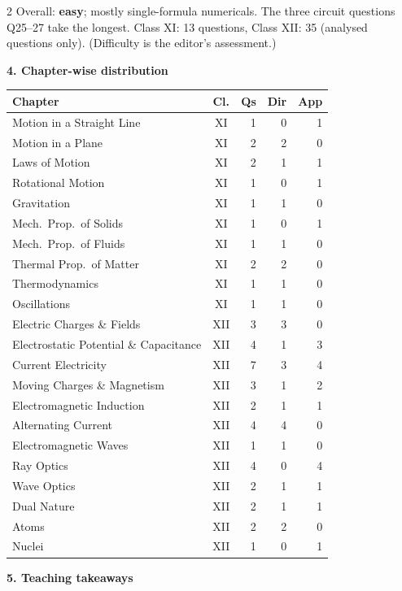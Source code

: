 \begin{multicols}{2}
{\footnotesize Overall: \textbf{easy}; mostly single-formula numericals. The three circuit questions Q25--27 take the longest. Class XI: 13 questions, Class XII: 35 (analysed questions only). (Difficulty is the editor's assessment.)}\par\medskip
\columnbreak
\textbf{\color{crimson}4. Chapter-wise distribution}\par\smallskip
{\footnotesize\begin{tabular}{@{}p{4.7cm}c@{\,}r@{\,}r@{\,}r@{}}\toprule
Chapter & Cl. & Qs & Dir & App\\\midrule
Motion in a Straight Line & XI & 1 & 0 & 1\\
Motion in a Plane & XI & 2 & 2 & 0\\
Laws of Motion & XI & 2 & 1 & 1\\
Rotational Motion & XI & 1 & 0 & 1\\
Gravitation & XI & 1 & 1 & 0\\
Mech.\ Prop.\ of Solids & XI & 1 & 0 & 1\\
Mech.\ Prop.\ of Fluids & XI & 1 & 1 & 0\\
Thermal Prop.\ of Matter & XI & 2 & 2 & 0\\
Thermodynamics & XI & 1 & 1 & 0\\
Oscillations & XI & 1 & 1 & 0\\
Electric Charges \& Fields & XII & 3 & 3 & 0\\
Electrostatic Potential \& Capacitance & XII & 4 & 1 & 3\\
Current Electricity & XII & 7 & 3 & 4\\
Moving Charges \& Magnetism & XII & 3 & 1 & 2\\
Electromagnetic Induction & XII & 2 & 1 & 1\\
Alternating Current & XII & 4 & 4 & 0\\
Electromagnetic Waves & XII & 1 & 1 & 0\\
Ray Optics & XII & 4 & 0 & 4\\
Wave Optics & XII & 2 & 1 & 1\\
Dual Nature & XII & 2 & 1 & 1\\
Atoms & XII & 2 & 2 & 0\\
Nuclei & XII & 1 & 0 & 1\\
\bottomrule\end{tabular}}\par\medskip
\textbf{\color{crimson}5. Teaching takeaways}\par\smallskip
{\footnotesize\begin{itemize}[leftmargin=1em,nosep]

\end{itemize}}
\end{multicols}
